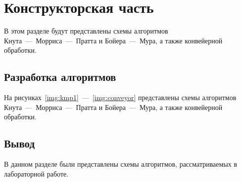 \chapter{Конструкторская часть}

В этом разделе будут представлены схемы алгоритмов Кнута~---~Морриса~---~Пратта и Бойера~---~Мура, а также конвейерной обработки.

\section{Разработка алгоритмов}

На рисунках~\ref{img:kmp1}~---~\ref{img:conveyor} представлены схемы алгоритмов Кнута~---~Морриса~---~Пратта и Бойера~---~Мура, а также конвейерной обработки.


\section{Вывод}

В данном разделе были представлены схемы алгоритмов, рассматриваемых в лабораторной работе.